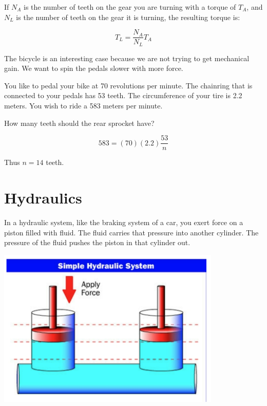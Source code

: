 If $N_A$ is the number of teeth on the gear you are turning with a
torque of $T_A$, and $N_L$ is the number of teeth on the gear it is
turning, the resulting torque is:

$$T_L = \frac{N_A}{N_L} T_A$$


\begin{Exercise}[title={Gears}, label=gear]

The bicycle is an interesting case because we are not trying to get
mechanical gain. We want to spin the pedals slower with more force.
  
You like to pedal your bike at 70 revolutions per minute. The
chainring that is connected to your pedals has 53 teeth. The
circumference of your tire is 2.2 meters. You wish to ride a 583 meters
per minute.

How many teeth should the rear sprocket have?
  
\end{Exercise}
\begin{Answer}[ref=ramp]
  
  $$583 = (70)(2.2)\frac{53}{n}$$
  
Thus $n = 14$ teeth.
\end{Answer}

\section{Hydraulics}

In a hydraulic system, like the braking system of a car, you exert
force on a piston filled with fluid. The fluid carries that pressure
into another cylinder. The pressure of the fluid pushes the piston in
that cylinder out.

\includegraphics[width=0.8\textwidth]{Hydraulics.png}


